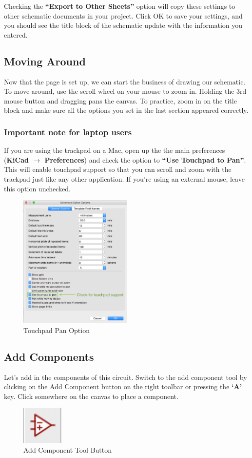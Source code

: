 \documentclass[12pt, oneside]{article}
\begin{document}
Checking the \textbf{``Export to Other Sheets''} option will copy these settings to other schematic documents in your project. Click OK to save your settings, and you should see the title block of the schematic update with the information you entered.

\subsection{Moving Around}
Now that the page is set up, we can start the business of drawing our schematic. To move around, use the scroll wheel on your mouse to zoom in. Holding the 3rd mouse button and dragging pans the canvas. To practice, zoom in on the title block and make sure all the options you set in the last section appeared correctly.

\subsubsection{Important note for laptop users}

If you are using the trackpad on a Mac, open up the the main preferences (\textbf{KiCad $\rightarrow$ Preferences}) and check the option to \textbf{``Use Touchpad to Pan''}. This will enable touchpad support so that you can scroll and zoom with the trackpad just like any other application.  If you're using an external mouse, leave this option unchecked.

\begin{figure}[H]
\includegraphics[width=0.5\textwidth]{TouchpadPan}
\centering
\caption{Touchpad Pan Option}
\end{figure}

\subsection{Add Components}
Let's add in the components of this circuit. Switch to the add component tool by clicking on the Add Component button on the right toolbar or pressing the \textbf{`A'} key. Click somewhere on the canvas to place a component.
\begin{figure}[H]
\includegraphics{AddComponent}
\centering
\caption{Add Component Tool Button}
\end{figure}
\end{document}

